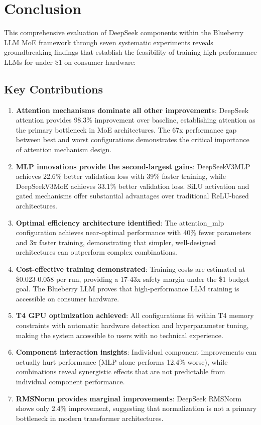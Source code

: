 \documentclass[11pt,a4paper]{article}
\begin{document}
\section{Conclusion}

This comprehensive evaluation of DeepSeek components within the Blueberry LLM MoE framework through seven systematic experiments reveals groundbreaking findings that establish the feasibility of training high-performance LLMs for under \$1 on consumer hardware:

\subsection{Key Contributions}

\begin{enumerate}
    \item \textbf{Attention mechanisms dominate all other improvements}: DeepSeek attention provides 98.3\% improvement over baseline, establishing attention as the primary bottleneck in MoE architectures. The 67x performance gap between best and worst configurations demonstrates the critical importance of attention mechanism design.
    
    \item \textbf{MLP innovations provide the second-largest gains}: DeepSeekV3MLP achieves 22.6\% better validation loss with 39\% faster training, while DeepSeekV3MoE achieves 33.1\% better validation loss. SiLU activation and gated mechanisms offer substantial advantages over traditional ReLU-based architectures.
    
    \item \textbf{Optimal efficiency architecture identified}: The attention\_mlp configuration achieves near-optimal performance with 40\% fewer parameters and 3x faster training, demonstrating that simpler, well-designed architectures can outperform complex combinations.
    
    \item \textbf{Cost-effective training demonstrated}: Training costs are estimated at \$0.023-0.058 per run, providing a 17-43x safety margin under the \$1 budget goal. The Blueberry LLM proves that high-performance LLM training is accessible on consumer hardware.
    
    \item \textbf{T4 GPU optimization achieved}: All configurations fit within T4 memory constraints with automatic hardware detection and hyperparameter tuning, making the system accessible to users with no technical experience.
    
    \item \textbf{Component interaction insights}: Individual component improvements can actually hurt performance (MLP alone performs 12.4\% worse), while combinations reveal synergistic effects that are not predictable from individual component performance.
    
    \item \textbf{RMSNorm provides marginal improvements}: DeepSeek RMSNorm shows only 2.4\% improvement, suggesting that normalization is not a primary bottleneck in modern transformer architectures.
\end{enumerate}
\end{document}
